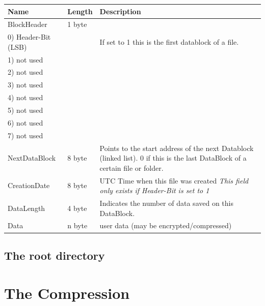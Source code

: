 \begin{tabular}{|l|l|p{5cm}|}
\hline
  \textbf{Name} & \textbf{Length} & \textbf{Description}
\\  \hline
 BlockHeader & 1 byte & 
 \\
 \hspace{0.2cm} 0) Header-Bit (LSB) & &  If set to 1 this is the first datablock
 of a file.
 \\ 
 \hspace{0.2cm} 1) not used & &  
 \\ 
 \hspace{0.2cm} 2) not used & &  
 \\ 
 \hspace{0.2cm} 3) not used & &  
 \\ 
 \hspace{0.2cm} 4) not used & &  
 \\ 
 \hspace{0.2cm} 5) not used & &  
 \\ 
 \hspace{0.2cm} 6) not used & &  
 \\ 
 \hspace{0.2cm} 7) not used & &  
 
\\  \hline
 NextDataBlock & 8 byte & 
 Points to the start address of the next Datablock (linked list).
    0 if this is the last DataBlock of a certain file or folder.
\\  \hline
  CreationDate & 8 byte & UTC Time when this file was created
  \newline \textit{This field only exists if Header-Bit is set to 1}
\\  \hline

  DataLength & 4 byte &
    Indicates the number of data saved on this DataBlock.
    
\\  \hline
 Data & n byte & user data (may be encrypted/compressed)
\\  \hline
\end{tabular}


\subsection{The root directory}


\section{The Compression}

